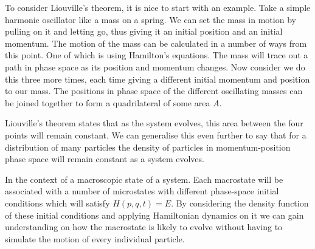 To consider Liouville’s theorem, it is nice to start with an example. Take a simple harmonic oscillator like a mass on a spring. We can set the mass in motion by pulling on it and letting go, thus giving it an initial position and an initial momentum. The motion of the mass can be calculated in a number of ways from this point. One of which is using Hamilton’s equations. The mass will trace out a path in phase space as its position and momentum changes. Now consider we do this three more times, each time giving a different initial momentum and position to our mass. The positions in phase space of the different oscillating masses can be joined together to form a quadrilateral of some area $A$.\medskip 


Liouville’s theorem states that as the system evolves, this area between the four points will remain constant. We can generalise this even further to say that for a distribution of many particles the density of particles in momentum-position phase space will remain constant as a system evolves. \medskip 


In the context of a macroscopic state of a system. Each macrostate will be associated with a number of microstates with different phase-space initial conditions which will satisfy $H(p,q,t)=E$. By considering the density function of these initial conditions and applying Hamiltonian dynamics on it we can gain understanding on how the macrostate is likely to evolve without having to simulate the motion of every individual particle.
